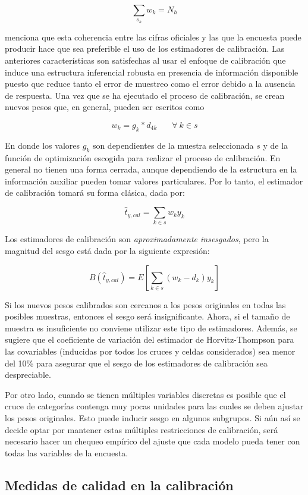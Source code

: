 \documentclass[
  12pt,
  spanish,
]{book}
\begin{document}
\[
\sum_{s_h} w_k = N_h
\]

\citet{Gutierrez_2016} menciona que esta coherencia entre las cifras oficiales y las que la encuesta puede producir hace que sea preferible el uso de los estimadores de calibración. Las anteriores características son satisfechas al usar el enfoque de calibración que induce una estructura inferencial robusta en presencia de información disponible puesto que reduce tanto el error de muestreo como el error debido a la ausencia de respuesta. Una vez que se ha ejecutado el proceso de calibración, se crean nuevos pesos que, en general, pueden ser escritos como

\[
w_k = g_k * d_{4k}  \ \ \ \ \ \ \ \ \forall \ k \in s
\]

En donde los valores \(g_k\) son dependientes de la muestra seleccionada \(s\) y de la función de optimización escogida para realizar el proceso de calibración. En general no tienen una forma cerrada, aunque dependiendo de la estructura en la información auxiliar pueden tomar valores particulares. Por lo tanto, el estimador de calibración tomará su forma clásica, dada por:

\[
\hat{t}_{y, cal} = \sum_{k\in s} w_k y_k
\]

Los estimadores de calibración son \emph{aproximadamente insesgados}, pero la magnitud del sesgo está dada por la siguiente expresión:

\[
B(\hat{t}_{y, cal}) = E\left[ \sum_{k \in s} (w_k - d_k) y_k \right]
\]

Si los nuevos pesos calibrados son cercanos a los pesos originales en todas las posibles muestras, entonces el sesgo será insignificante. Ahora, si el tamaño de muestra es insuficiente no conviene utilizar este tipo de estimadores. Además, se sugiere que el coeficiente de variación del estimador de Horvitz-Thompson para las covariables (inducidas por todos los cruces y celdas considerados) sea menor del 10\% para asegurar que el sesgo de los estimadores de calibración sea despreciable.

Por otro lado, cuando se tienen múltiples variables discretas es posible que el cruce de categorías contenga muy pocas unidades para las cuales se deben ajustar los pesos originales. Esto puede inducir sesgo en algunos subgrupos. Si aún así se decide optar por mantener estas múltiples restricciones de calibración, será necesario hacer un chequeo empírico del ajuste que cada modelo pueda tener con todas las variables de la encuesta.

\hypertarget{medidas-de-calidad-en-la-calibraciuxf3n}{%
\subsection{Medidas de calidad en la calibración}\label{medidas-de-calidad-en-la-calibraciuxf3n}}
\end{document}

